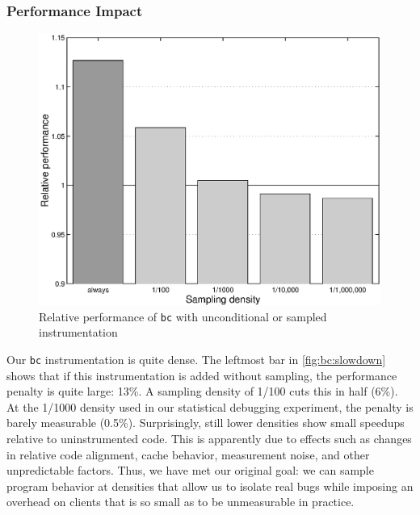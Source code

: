 \subsubsection{Performance Impact}

\begin{figure}
  \centering
  \small
  \includegraphics[width=\columnwidth]{applications/bc_density}
  \caption{Relative performance of \texttt{bc} with unconditional or
    sampled instrumentation}
  \label{fig:bc:slowdown}
\end{figure}

Our \texttt{bc} instrumentation is quite dense.  The leftmost bar in
\autoref{fig:bc:slowdown} shows that if this instrumentation is added
without sampling, the performance penalty is quite large: 13\%.  A
sampling density of 1/100 cuts this in half (6\%).  At the 1/1000
density used in our statistical debugging experiment, the penalty is
barely measurable (0.5\%).  Surprisingly, still lower densities show
small speedups relative to uninstrumented code.  This is apparently
due to effects such as changes in relative code alignment, cache
behavior, measurement noise, and other unpredictable factors.  Thus,
we have met our original goal: we can sample program behavior at
densities that allow us to isolate real bugs while imposing an
overhead on clients that is so small as to be unmeasurable in
practice.



